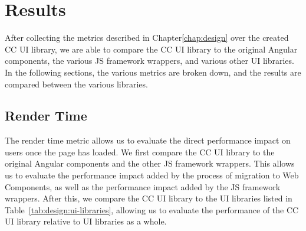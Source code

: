 \chapter{Results}\label{chap:results}
After collecting the metrics described in Chapter\ref{chap:design} over the created CC UI library, we are able to compare the CC UI library to the original Angular components, the various JS framework wrappers, and various other UI libraries. In the following sections, the various metrics are broken down, and the results are compared between the various libraries.

\section{Render Time}
The render time metric allows us to evaluate the direct performance impact on users once the page has loaded. We first compare the CC UI library to the original Angular components and the other JS framework wrappers. This allows us to evaluate the performance impact added by the process of migration to Web Components, as well as the performance impact added by the JS framework wrappers. After this, we compare the CC UI library to the UI libraries listed in Table~\ref{tab:design:ui-libraries}, allowing us to evaluate the performance of the CC UI library relative to UI libraries as a whole.

